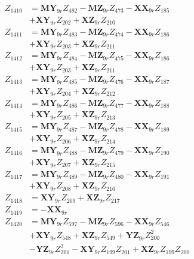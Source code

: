 \begin{multicols}{2}
\begin{align}
Z_{1410} &= \mathbf{MY}_{9r}Z_{482} - \mathbf{MZ}_{9r}Z_{473} - \mathbf{XX}_{9r}Z_{185}  \nonumber \\
&+ \mathbf{XY}_{9r}Z_{202} + \mathbf{XZ}_{9r}Z_{210} \nonumber \\
Z_{1411} &= \mathbf{MY}_{9r}Z_{483} - \mathbf{MZ}_{9r}Z_{474} - \mathbf{XX}_{9r}Z_{186}  \nonumber \\
&+ \mathbf{XY}_{9r}Z_{203} + \mathbf{XZ}_{9r}Z_{211} \nonumber \\
Z_{1412} &= \mathbf{MY}_{9r}Z_{484} - \mathbf{MZ}_{9r}Z_{475} - \mathbf{XX}_{9r}Z_{186}  \nonumber \\
&+ \mathbf{XY}_{9r}Z_{203} + \mathbf{XZ}_{9r}Z_{211} \nonumber \\
Z_{1413} &= \mathbf{MY}_{9r}Z_{485} - \mathbf{MZ}_{9r}Z_{476} - \mathbf{XX}_{9r}Z_{187}  \nonumber \\
&+ \mathbf{XY}_{9r}Z_{204} + \mathbf{XZ}_{9r}Z_{212} \nonumber \\
Z_{1414} &= \mathbf{MY}_{9r}Z_{486} - \mathbf{MZ}_{9r}Z_{477} - \mathbf{XX}_{9r}Z_{188}  \nonumber \\
&+ \mathbf{XY}_{9r}Z_{205} + \mathbf{XZ}_{9r}Z_{213} \nonumber \\
Z_{1415} &= \mathbf{MY}_{9r}Z_{487} - \mathbf{MZ}_{9r}Z_{478} - \mathbf{XX}_{9r}Z_{189}  \nonumber \\
&+ \mathbf{XY}_{9r}Z_{206} + \mathbf{XZ}_{9r}Z_{214} \nonumber \\
Z_{1416} &= \mathbf{MY}_{9r}Z_{488} - \mathbf{MZ}_{9r}Z_{479} - \mathbf{XX}_{9r}Z_{190}  \nonumber \\
&+ \mathbf{XY}_{9r}Z_{207} + \mathbf{XZ}_{9r}Z_{215} \nonumber \\
Z_{1417} &= \mathbf{MY}_{9r}Z_{489} - \mathbf{MZ}_{9r}Z_{480} - \mathbf{XX}_{9r}Z_{191}  \nonumber \\
&+ \mathbf{XY}_{9r}Z_{208} + \mathbf{XZ}_{9r}Z_{216} \nonumber \\
Z_{1418} &= \mathbf{XY}_{9r}Z_{209} + \mathbf{XZ}_{9r}Z_{217} \nonumber \\
Z_{1419} &= -\mathbf{XX}_{9r} \nonumber \\
Z_{1420} &= \mathbf{MY}_{9r}Z_{597} - \mathbf{MZ}_{9r}Z_{596} - \mathbf{XX}_{9r}Z_{546}  \nonumber \\
&+ \mathbf{XY}_{9r}Z_{548} + \mathbf{XZ}_{9r}Z_{549} + \mathbf{YZ}_{9r}Z_{200}^2  \nonumber \\
&- \mathbf{YZ}_{9r}Z_{201}^2 - \mathbf{XY}_{9r}Z_{199}Z_{201} + \mathbf{XZ}_{9r}Z_{199}Z_{200}  \nonumber \\

\end{align}
\end{multicols}
